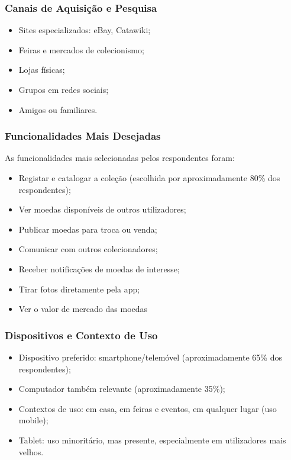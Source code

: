 \documentclass[12pt,a4paper]{article}
\begin{document}
\subsubsection{Canais de Aquisição e Pesquisa}

\begin{itemize}
\setlength{\itemsep}{0.15em}
\item Sites especializados: eBay, Catawiki;
\item Feiras e mercados de colecionismo;
\item Lojas físicas;
\item Grupos em redes sociais;
\item Amigos ou familiares.
\end{itemize}

\subsubsection{Funcionalidades Mais Desejadas}

As funcionalidades mais selecionadas pelos respondentes foram:

\begin{itemize}
\setlength{\itemsep}{0.15em}
\item Registar e catalogar a coleção (escolhida por aproximadamente 80\% dos respondentes);
\item Ver moedas disponíveis de outros utilizadores;
\item Publicar moedas para troca ou venda;
\item Comunicar com outros colecionadores;
\item Receber notificações de moedas de interesse;
\item Tirar fotos diretamente pela app;
\item Ver o valor de mercado das moedas
\end{itemize}

\subsubsection{Dispositivos e Contexto de Uso}

\begin{itemize}
\setlength{\itemsep}{0.15em}
\item Dispositivo preferido: smartphone/telemóvel (aproximadamente 65\% dos respondentes);
\item Computador também relevante (aproximadamente 35\%);
\item Contextos de uso: em casa, em feiras e eventos, em qualquer lugar (uso mobile);
\item Tablet: uso minoritário, mas presente, especialmente em utilizadores mais velhos.
\end{itemize}
\end{document}
